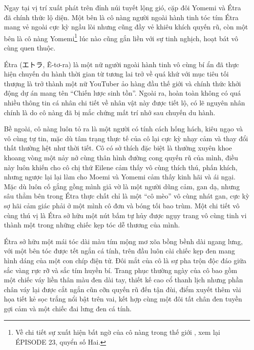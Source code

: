 \documentclass[../main.tex]{subfiles}
\begin{document}
Ngay tại vị trí xuất phát trên đỉnh núi tuyết lộng gió, cặp đôi Yomemi và Étra đã chính thức lộ diện. Một bên là cô nàng người ngoài hành tinh tóc tím Étra mang vẻ ngoài cực kỳ ngầu lòi nhưng cũng đầy vẻ khiêu khích quyến rũ, còn một bên là cô nàng Yomemi\footnote{Về chi tiết sự xuất hiện bất ngờ của cô nàng trong thế giới \hll, xem lại {\flaregothic ÉPISODE 23}, quyển số Hai.} lúc nào cũng gắn liền với sự tinh nghịch, hoạt bát vô cùng quen thuộc.

\chrint

Étra (エトラ, Ê-tơ-ra) là một nữ người ngoài hành tinh vô cùng bí ẩn đã thực hiện chuyến du hành thời gian từ tương lai trở về quá khứ với mục tiêu tối thượng là trở thành một nữ YouTuber ảo hàng đầu thế giới và chính thức khởi động dự án mang tên ``Chiến lược sinh tồn''. Ngoài ra, hoàn toàn không có quá nhiều thông tin cá nhân chi tiết về nhân vật này được tiết lộ, có lẽ nguyên nhân chính là do cô nàng đã bị mắc chứng mất trí nhớ sau chuyến du hành.

Bề ngoài, cô nàng luôn tỏ ra là một người có tính cách hống hách, kiêu ngạo và vô cùng tự tin, mặc dù tâm trạng thực tế của cô lại cực kỳ nhạy cảm và thay đổi thất thường hệt như thời tiết. Cô có sở thích đặc biệt là thường xuyên khoe khoang vòng một nảy nở cùng thân hình đường cong quyến rũ của mình, điều này luôn khiến cho cô chị thứ Eilene cảm thấy vô cùng thích thú, phấn khích, nhưng ngược lại lại làm cho Moemi và Yomemi cảm thấy kinh hãi và ái ngại. Mặc dù luôn cố gắng gồng mình giả vờ là một người dũng cảm, gan dạ, nhưng sâu thẳm bên trong Étra thực chất chỉ là một ``cô mèo'' vô cùng nhát gan, cực kỳ sợ hãi cảm giác phải ở một mình cô đơn và bóng tối bao trùm. Một chi tiết vô cùng thú vị là Étra sở hữu một nút bấm tự hủy được ngụy trang vô cùng tinh vi thành một trong những chiếc kẹp tóc dễ thương của mình.


Étra sở hữu một mái tóc dài màu tím mộng mơ xõa bồng bềnh dài ngang lưng, với một bên tóc được tết ngắn cá tính, trên đầu luôn cài chiếc kẹp đen mang hình dáng của một con chíp điện tử. Đôi mắt của cô là sự pha trộn độc đáo giữa sắc vàng rực rỡ và sắc tím huyền bí. Trang phục thường ngày của cô bao gồm một chiếc váy liền thân màu đen dài tay, thiết kế cao cổ thanh lịch nhưng phần chân váy lại được cắt ngắn cũn cỡn quyến rũ đến tận đùi, điểm xuyết thêm vài họa tiết kẻ sọc trắng nổi bật trên vai, kết hợp cùng một đôi tất chân đen tuyền gợi cảm và một chiếc đai lưng đen cá tính.

\chrint
\end{document}
